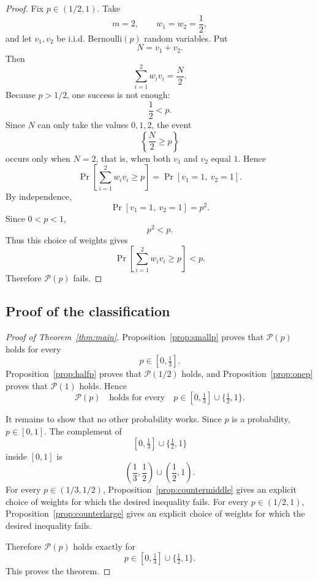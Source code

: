 \documentclass[12pt]{article}
\theoremstyle{definition}
\theoremstyle{plain}
\theoremstyle{remark}
\begin{document}
\begin{proof}
Fix \(p\in(1/2,1)\). Take
\[
m=2,\qquad w_1=w_2=\frac12,
\]
and let \(v_1,v_2\) be i.i.d. Bernoulli\((p)\) random variables. Put
\[
N=v_1+v_2.
\]
Then
\[
\sum_{i=1}^{2}w_i v_i=\frac{N}{2}.
\]
Because \(p>1/2\), one success is not enough:
\[
\frac12<p.
\]
Since \(N\) can only take the values \(0,1,2\), the event
\[
\left\{\frac{N}{2}\ge p\right\}
\]
occurs only when \(N=2\), that is, when both \(v_1\) and \(v_2\) equal \(1\). Hence
\[
\Pr\!\left[\sum_{i=1}^{2}w_i v_i\ge p\right]
=
\Pr[v_1=1,\ v_2=1].
\]
By independence,
\[
\Pr[v_1=1,\ v_2=1]=p^2.
\]
Since \(0<p<1\),
\[
p^2<p.
\]
Thus this choice of weights gives
\[
\Pr\!\left[\sum_{i=1}^{2}w_i v_i\ge p\right]<p.
\]
Therefore \(\mathcal P(p)\) fails.
\end{proof}

\subsection{Proof of the classification}

\begin{proof}[Proof of Theorem~\ref{thm:main}]
Proposition~\ref{prop:smallp} proves that \(\mathcal P(p)\) holds for every
\[
p\in[0,\tfrac13].
\]
Proposition~\ref{prop:halfp} proves that \(\mathcal P(1/2)\) holds, and Proposition~\ref{prop:onep} proves that \(\mathcal P(1)\) holds. Hence
\[
\mathcal P(p)\quad\text{holds for every}\quad
p\in[0,\tfrac13]\cup\{\tfrac12,1\}.
\]

It remains to show that no other probability works. Since \(p\) is a probability, \(p\in[0,1]\). The complement of
\[
[0,\tfrac13]\cup\{\tfrac12,1\}
\]
inside \([0,1]\) is
\[
\left(\frac13,\frac12\right)\cup\left(\frac12,1\right).
\]
For every \(p\in(1/3,1/2)\), Proposition~\ref{prop:countermiddle} gives an explicit choice of weights for which the desired inequality fails. For every \(p\in(1/2,1)\), Proposition~\ref{prop:counterlarge} gives an explicit choice of weights for which the desired inequality fails.

Therefore \(\mathcal P(p)\) holds exactly for
\[
p\in[0,\tfrac13]\cup\{\tfrac12,1\}.
\]
This proves the theorem.
\end{proof}
\end{document}

